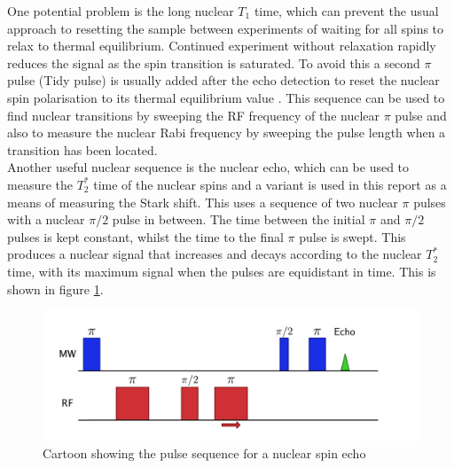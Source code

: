 One potential problem is the long nuclear $T_1$ time, which can prevent the usual approach to resetting the sample between experiments of waiting for all spins to relax to thermal equilibrium.
Continued experiment without relaxation rapidly reduces the signal as the spin transition is saturated.
To avoid this a second $\pi$ pulse (Tidy pulse) is usually added after the echo detection to reset the nuclear spin polarisation to its thermal equilibrium value \cite{Morton2008a}.
This sequence can be used to find nuclear transitions by sweeping the RF frequency of the nuclear $\pi$ pulse and also to measure the nuclear Rabi frequency by sweeping the pulse length when a transition has been located.
\\
Another useful nuclear sequence is the nuclear echo, which can be used to measure the $T_2^*$ time of the nuclear spins and a variant is used in this report as a means of measuring the Stark shift.
This uses a sequence of two nuclear $\pi$ pulses with a nuclear $\pi/2$ pulse in between. 
The time between the initial $\pi$ and $\pi/2$ pulses is kept constant, whilst the time to the final $\pi$ pulse is swept. 
This produces a nuclear signal that increases and decays according to the nuclear $T_2^*$ time, with its maximum signal when the pulses are equidistant in time.
This is shown in figure \ref{fig:nuclearecho}.

\begin{figure}
\centering
\includegraphics[width=\columnwidth]{Figures/NucEchoSequence2.pdf}
\caption[Nuclear echo pulse sequence]{Cartoon showing the pulse sequence for a nuclear spin echo}
\label{fig:nuclearecho}
\end{figure}